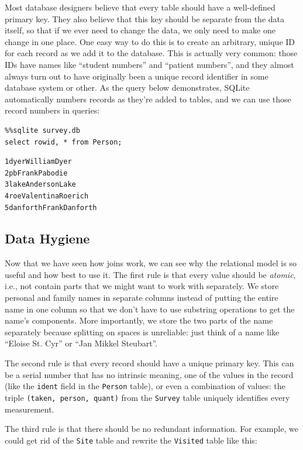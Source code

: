 \documentclass[]{book}
\newcommand{\gdef}[2]{\emph{#2}}
\begin{document}
Most database designers believe that every table should have a
well-defined primary key. They also believe that this key should be
separate from the data itself, so that if we ever need to change the
data, we only need to make one change in one place. One easy way to do
this is to create an arbitrary, unique ID for each record as we add it
to the database. This is actually very common: those IDs have names like
``student numbers'' and ``patient numbers'', and they almost always turn
out to have originally been a unique record identifier in some database
system or other. As the query below demonstrates, SQLite automatically
numbers records as they're added to tables, and we can use those record
numbers in queries:

\begin{verbatim}
%%sqlite survey.db
select rowid, * from Person;
\end{verbatim}

\begin{verbatim}
1dyerWilliamDyer
2pbFrankPabodie
3lakeAndersonLake
4roeValentinaRoerich
5danforthFrankDanforth
\end{verbatim}

\subsection{Data Hygiene}

Now that we have seen how joins work, we can see why the relational
model is so useful and how best to use it. The first rule is that every
value should be \gdef{g:atomic-value}{atomic}, i.e., not contain
parts that we might want to work with separately. We store personal and
family names in separate columns instead of putting the entire name in
one column so that we don't have to use substring operations to get the
name's components. More importantly, we store the two parts of the name
separately because splitting on spaces is unreliable: just think of a
name like ``Eloise St. Cyr'' or ``Jan Mikkel Steubart''.

The second rule is that every record should have a unique primary key.
This can be a serial number that has no intrinsic meaning, one of the
values in the record (like the \texttt{ident} field in the
\texttt{Person} table), or even a combination of values: the triple
\texttt{(taken, person, quant)} from the \texttt{Survey} table uniquely
identifies every measurement.

The third rule is that there should be no redundant information. For
example, we could get rid of the \texttt{Site} table and rewrite the
\texttt{Visited} table like this:
\end{document}
